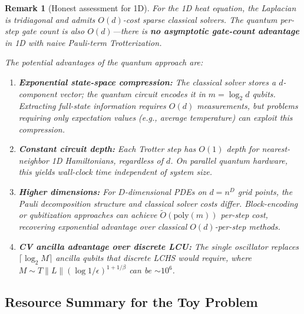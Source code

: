 \documentclass[11pt]{article}
\newtheorem{remark}{Remark}
\begin{document}
\begin{remark}[Honest assessment for 1D]
For the \emph{1D} heat equation, the Laplacian is tridiagonal and
admits $O(d)$-cost sparse classical solvers.  The quantum per-step gate
count is also $O(d)$---there is \textbf{no asymptotic gate-count advantage}
in 1D with naive Pauli-term Trotterization.

The potential advantages of the quantum approach are:
\begin{enumerate}
  \item \textbf{Exponential state-space compression:}
        The classical solver stores a $d$-component vector; the quantum
        circuit encodes it in $m = \log_2 d$ qubits.
        Extracting full-state information requires $O(d)$ measurements,
        but problems requiring only expectation values (e.g., average
        temperature) can exploit this compression.
  \item \textbf{Constant circuit depth:}
        Each Trotter step has $O(1)$ depth for nearest-neighbor 1D
        Hamiltonians, regardless of $d$.  On parallel quantum hardware,
        this yields wall-clock time independent of system size.
  \item \textbf{Higher dimensions:}
        For $D$-dimensional PDEs on $d = n^D$ grid points, the Pauli
        decomposition structure and classical solver costs differ.
        Block-encoding or qubitization approaches can achieve
        $\tilde{O}(\mathrm{poly}(m))$ per-step cost, recovering
        exponential advantage over classical $O(d)$-per-step methods.
  \item \textbf{CV ancilla advantage over discrete LCU:}
        The single oscillator replaces $\lceil\log_2 M\rceil$ ancilla
        qubits that discrete LCHS would require, where
        $M \sim T\|L\|(\log 1/\epsilon)^{1+1/\beta}$ can be $\sim 10^6$.
\end{enumerate}
\end{remark}

\subsection{Resource Summary for the Toy Problem}
\end{document}
